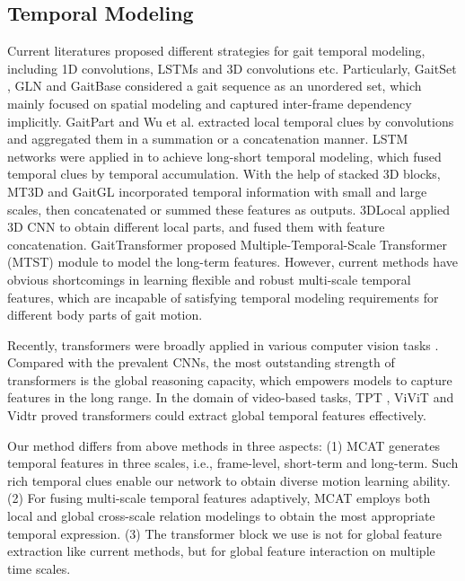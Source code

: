 \documentclass[journal]{IEEEtran}
\begin{document}
\subsection{Temporal Modeling}
Current literatures proposed different strategies for gait temporal modeling, including 1D convolutions, LSTMs and 3D convolutions etc. Particularly, GaitSet \cite{chao2021gaitset}, GLN \cite{hou2020gait} and GaitBase \cite{fan2023opengait} considered a gait sequence as an unordered set, which mainly focused on spatial modeling and captured inter-frame dependency implicitly. GaitPart \cite{fan2020gaitpart} and Wu et al. \cite{wu2020condition} extracted local temporal clues by convolutions and aggregated them in a summation or a concatenation manner. LSTM networks were applied in \cite{zhang2019cross, zhang2020learning} to achieve long-short temporal modeling, which fused temporal clues by temporal accumulation. With the help of stacked 3D blocks, MT3D \cite{lin2020gait} and GaitGL \cite{GaitGL} incorporated temporal information with small and large scales, then concatenated or summed these features as outputs. 3DLocal \cite{local3DCNN} applied 3D CNN to obtain different local parts, and fused them with feature concatenation. GaitTransformer \cite{cui2022gaittransformer} proposed Multiple-Temporal-Scale Transformer (MTST) module to model the long-term features. However, current methods have obvious shortcomings in learning flexible and robust multi-scale temporal features, which are incapable of satisfying temporal modeling requirements for different body parts of gait motion. 
 
Recently, transformers were broadly applied in various computer vision tasks \cite{vit, swin, zhao2022spatial, tang2022multi}. Compared with the prevalent CNNs, the most outstanding strength of transformers is the global reasoning capacity, which empowers models to capture features in the long range. In the domain of video-based tasks, TPT \cite{zhang2023end}, ViViT \cite{vivit} and Vidtr \cite{vidtr} proved transformers could extract global temporal features effectively. 

Our method differs from above methods in three aspects: (1) MCAT generates temporal features in three scales, i.e., frame-level, short-term and long-term. Such rich temporal clues enable our network to obtain diverse motion learning ability. (2) For fusing multi-scale temporal features adaptively, MCAT employs both local and global cross-scale relation modelings to obtain the most appropriate temporal expression. (3) The transformer block we use is not for global feature extraction like current methods, but for global feature interaction on multiple time scales.
\end{document}
